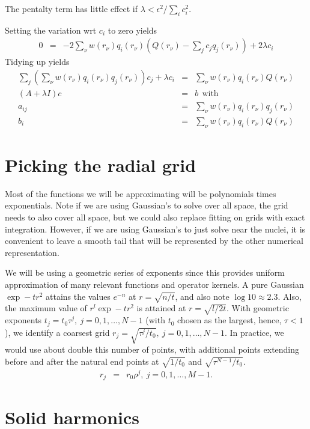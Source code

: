 \documentclass[12pt]{article}
\begin{document}
The pentalty term has little effect if $\lambda < \epsilon^2 / \sum_i c_i^2$. 

Setting the variation wrt $c_i$ to zero yields
\begin{eqnarray}
  0 & = & - 2 \sum_\nu  w(r_\nu) q_i(r_\nu) \left( Q(r_\nu) - \sum_j c_j q_j(r_\nu) \right) + 2\lambda c_i
\end{eqnarray}
Tidying up yields
\begin{eqnarray}
  \sum_j \left( \sum_\nu w(r_\nu) q_i(r_\nu) q_j(r_\nu) \right) c_j + \lambda c_i & = & \sum_\nu  w(r_\nu) q_i(r_\nu)  Q(r_\nu) \\
  \left( A + \lambda I \right) c & = & b ~ ~\mbox{with} \\
  a_{ij} & = & \sum_\nu w(r_\nu) q_i(r_\nu) q_j(r_\nu) \\
  b_i & = & \sum_\nu  w(r_\nu)  q_i(r_\nu) Q(r_\nu) 
\end{eqnarray}

\section{Picking the radial grid}

Most of the functions we will be approximating will be polynomials times exponentials. Note if we are using Gaussian's to solve over all space, the grid needs to also cover all space, but we could also replace fitting on grids with exact integration.  However, if we are using Gaussian's to just solve near the nuclei, it is convenient to leave a smooth tail that will be represented by the other numerical representation.

We will be using a geometric series of exponents since this provides uniform approximation of many relevant functions and operator kernels.  A pure Gaussian $\exp -t r^2$ attains the values $e^{-n}$ at $r=\sqrt{n/t}$, and also note $\log 10 \approx 2.3$.  Also, the maximum value of $r^l \exp -t r^2$ is attained at $r=\sqrt{l/2t}$.  With geometric exponents $t_j=t_0 \tau^j,~j=0,1,\ldots,N-1$ (with $t_0$ chosen as the largest, hence, $\tau < 1$), we identify a coarsest grid $r_j = \sqrt{\tau^j / t_0},~j=0,1,\ldots,N-1$.  In practice, we would use about double this number of points, with additional points extending before and after the natural end points at $\sqrt{1/t_0}$ and $\sqrt{\tau^{N-1}/t_0}$.
\begin{eqnarray}
   r_j & = & r_0 \rho^j, ~ j=0,1,\ldots,M-1.
\end{eqnarray}

\section{Solid harmonics}
\end{document}
